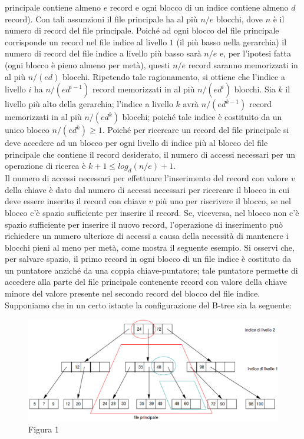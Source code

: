 principale contiene almeno $e$ record e ogni blocco di un indice contiene almeno $d$ record). Con tali
assunzioni il file principale ha al più $n/e$ blocchi, dove $n$ è il numero di record del file principale.
Poiché ad ogni blocco del file principale corrisponde un record nel file indice al livello $1$ (il più
basso nella gerarchia) il numero di record del file indice a livello più basso sarà $n/e$ e, per l'ipotesi
fatta (ogni blocco è pieno almeno per metà), questi $n/e$ record saranno memorizzati in al più $n/(ed)$
blocchi. Ripetendo tale ragionamento, si ottiene che l'indice a livello $i$ ha $n/(ed^{i-1})$ record
memorizzati in al più $n/(ed^i)$ blocchi. Sia $k$ il livello più alto della gerarchia; l'indice a livello
$k$ avrà $n/(ed^{k- 1})$ record memorizzati in al più $n/(ed^k)$ blocchi; poiché tale indice è costituito 
da un unico blocco $n/(ed^k)\geq 1$. Poiché per ricercare un record del file principale si deve accedere 
ad un blocco per ogni livello di indice più al blocco del file principale che contiene il record 
desiderato, il numero di accessi necessari per un operazione di ricerca è $k +1 \leq log_d(n/e)+1$.\\
Il numero di accessi necessari per effettuare l'inserimento del record con valore $v$ della chiave è
dato dal numero di accessi necessari per ricercare il blocco in cui deve essere inserito il record con
chiave $v$ più uno per riscrivere il blocco, se nel blocco c'è spazio sufficiente per inserire il record.
Se, viceversa, nel blocco non c'è spazio sufficiente per inserire il nuovo record, l'operazione di
inserimento può richiedere un numero ulteriore di accessi a causa della necessità di mantenere i
blocchi pieni al meno per metà, come mostra il seguente esempio. Si osservi che, per salvare spazio,
il primo record in ogni blocco di un file indice è costituto da un puntatore anziché da una coppia
chiave-puntatore; tale puntatore permette di accedere alla parte del file principale contenente record
con valore della chiave minore del valore presente nel secondo record del blocco del file indice.
Supponiamo che in un certo istante la configurazione del B-tree sia la seguente:
\begin{figure}[h!]
  \centering
  \includegraphics[width=430px]{img_5_3_4(1).eps}
  Figura 1
\end{figure}

